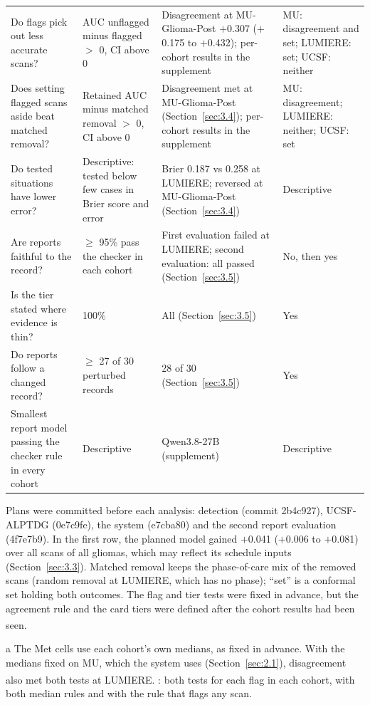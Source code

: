 \documentclass[largeformat]{interact} %
\newcommand{\expl}{\textsuperscript{\textdagger}}
\begin{document}
\begin{table}[!htbp]
\begin{threeparttable}
\begin{tabularx}{\linewidth}{@{}R{3.6cm}R{3.8cm}LR{2.6cm}@{}}
Do flags pick out less accurate scans? & AUC unflagged minus flagged $>$ 0, CI above 0 & Disagreement at MU-Glioma-Post $+$0.307 ($+$0.175 to $+$0.432); per-cohort results in the supplement & MU: disagreement and set; LUMIERE: set; UCSF: neither \\
Does setting flagged scans aside beat matched removal? & Retained AUC minus matched removal $>$ 0, CI above 0 & Disagreement met at MU-Glioma-Post (Section~\ref{sec:3.4}); per-cohort results in the supplement & MU: disagreement; LUMIERE: neither; UCSF: set \\
Do tested situations have lower error? & Descriptive: tested below few cases in Brier score and error & Brier 0.187 vs 0.258 at LUMIERE; reversed at MU-Glioma-Post (Section~\ref{sec:3.4}) & Descriptive \\
Are reports faithful to the record? & $\geq$ 95\% pass the checker in each cohort & First evaluation failed at LUMIERE; second evaluation: all passed (Section~\ref{sec:3.5}) & No, then yes \\
Is the tier stated where evidence is thin? & 100\% & All (Section~\ref{sec:3.5}) & Yes \\
Do reports follow a changed record? & $\geq$ 27 of 30 perturbed records & 28 of 30 (Section~\ref{sec:3.5}) & Yes \\
Smallest report model passing the checker rule in every cohort & Descriptive & Qwen3.8-27B (supplement) & Descriptive \\
\bottomrule
\end{tabularx}
\begin{tablenotes}\footnotesize
\item Plans were committed before each analysis: detection (commit 2b4c927), UCSF-ALPTDG (0e7c9fe), the system
(e7cba80) and the second report evaluation (4f7e7b9). In the first row, the planned model gained $+$0.041 ($+$0.006
to $+$0.081) over all scans of all gliomas, which may reflect its schedule inputs (Section~\ref{sec:3.3}).  Matched removal keeps the
phase-of-care mix of the removed scans (random removal at LUMIERE, which has no phase); ``set'' is a conformal set
holding both outcomes. The flag and tier tests were fixed in advance, but the agreement rule and the card tiers were
defined after the cohort results had been seen\expl.
\item[a] The Met cells use each cohort's own medians, as fixed in advance. With the medians fixed on MU, which the
system uses (Section~\ref{sec:2.1}), disagreement also met both tests at LUMIERE\expl. : both tests for each flag in each cohort, with both median rules and with the rule that flags any scan.
\end{tablenotes}
\end{threeparttable}
\end{table}
\end{document}
